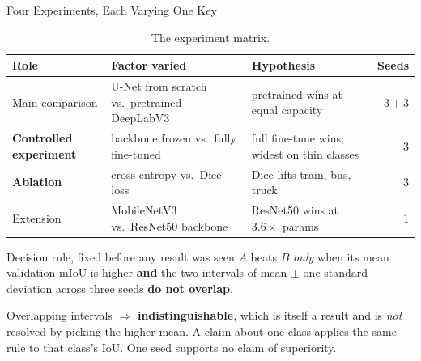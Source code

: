 \begin{frame}{Four Experiments, Each Varying One Key}
\small
\begin{table}
\centering
\scriptsize
\caption{The experiment matrix.}
\label{tab:experiments}
\begin{tabular}{lll r}
\toprule
\textbf{Role} & \textbf{Factor varied} & \textbf{Hypothesis} & \textbf{Seeds} \\
\midrule
Main comparison & U-Net from scratch vs.\ pretrained DeepLabV3 & pretrained wins at equal capacity & $3{+}3$ \\
\textbf{Controlled experiment} & backbone frozen vs.\ fully fine-tuned & full fine-tune wins; widest on thin classes & 3 \\
\textbf{Ablation} & cross-entropy vs.\ Dice loss & Dice lifts train, bus, truck & 3 \\
Extension & MobileNetV3 vs.\ ResNet50 backbone & ResNet50 wins at $3.6\times$ params & 1 \\
\bottomrule
\end{tabular}
\end{table}

\vspace{-0.1cm}
\begin{block}{Decision rule, fixed before any result was seen}
$A$ beats $B$ \emph{only} when its mean validation mIoU is higher \textbf{and} the two intervals
of mean $\pm$ one standard deviation across three seeds \textbf{do not overlap}.

Overlapping intervals $\Rightarrow$ \textbf{indistinguishable}, which is itself a result and is
\emph{not} resolved by picking the higher mean. A claim about one class applies the same rule to
that class's IoU. One seed supports no claim of superiority.
\end{block}
\end{frame}
